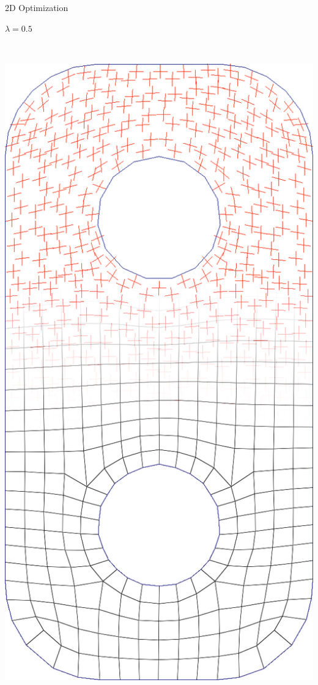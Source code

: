 \documentclass{beamer}
\begin{document}
\begin{frame}{2D Optimization}
\begin{minipage}[b]{0.15\textwidth}
        $\lambda = 0.5$
    \end{minipage}
    \ \ \ 
    \begin{minipage}[b]{0.15\textwidth}
        \centering
        \includegraphics[width=\textwidth]{img_spm_ff/perced_16}

\end{minipage}
\end{frame}
\end{document}
